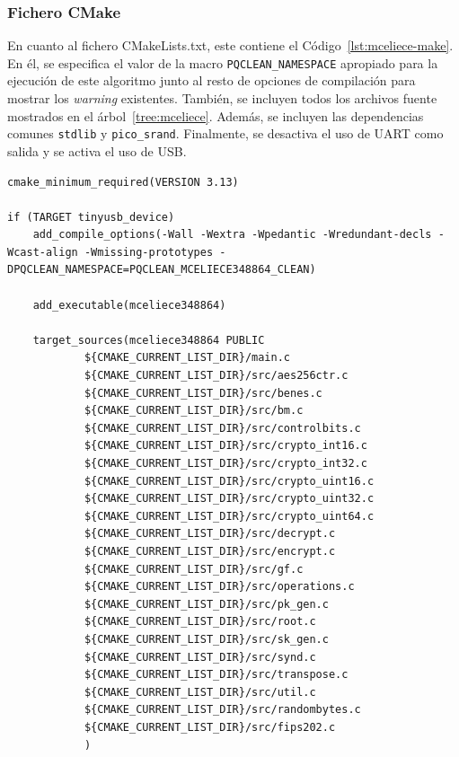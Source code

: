 \subsubsection{Fichero CMake}\label{subsubsec:mceliece-cmake}

En cuanto al fichero CMakeLists.txt, este contiene el Código~\ref{lst:mceliece-make}.
En él, se especifica el valor de la macro \texttt{PQCLEAN\_NAMESPACE} apropiado para la ejecución de este algoritmo junto al resto de opciones de compilación para mostrar los \textit{warning} existentes.
También, se incluyen todos los archivos fuente mostrados en el árbol~\ref{tree:mceliece}.
Además, se incluyen las dependencias comunes \texttt{stdlib} y \texttt{pico\_srand}.
Finalmente, se desactiva el uso de \ac{UART} como salida y se activa el uso de \ac{USB}.

\begin{lstlisting}[label={lst:mceliece-make},style=Cnice,firstnumber=1,caption={Archivo \texttt{McEliece348864/CMakeLists.txt}.}]
cmake_minimum_required(VERSION 3.13)

if (TARGET tinyusb_device)
    add_compile_options(-Wall -Wextra -Wpedantic -Wredundant-decls -Wcast-align -Wmissing-prototypes -DPQCLEAN_NAMESPACE=PQCLEAN_MCELIECE348864_CLEAN)

    add_executable(mceliece348864)

    target_sources(mceliece348864 PUBLIC
            ${CMAKE_CURRENT_LIST_DIR}/main.c
            ${CMAKE_CURRENT_LIST_DIR}/src/aes256ctr.c
            ${CMAKE_CURRENT_LIST_DIR}/src/benes.c
            ${CMAKE_CURRENT_LIST_DIR}/src/bm.c
            ${CMAKE_CURRENT_LIST_DIR}/src/controlbits.c
            ${CMAKE_CURRENT_LIST_DIR}/src/crypto_int16.c
            ${CMAKE_CURRENT_LIST_DIR}/src/crypto_int32.c
            ${CMAKE_CURRENT_LIST_DIR}/src/crypto_uint16.c
            ${CMAKE_CURRENT_LIST_DIR}/src/crypto_uint32.c
            ${CMAKE_CURRENT_LIST_DIR}/src/crypto_uint64.c
            ${CMAKE_CURRENT_LIST_DIR}/src/decrypt.c
            ${CMAKE_CURRENT_LIST_DIR}/src/encrypt.c
            ${CMAKE_CURRENT_LIST_DIR}/src/gf.c
            ${CMAKE_CURRENT_LIST_DIR}/src/operations.c
            ${CMAKE_CURRENT_LIST_DIR}/src/pk_gen.c
            ${CMAKE_CURRENT_LIST_DIR}/src/root.c
            ${CMAKE_CURRENT_LIST_DIR}/src/sk_gen.c
            ${CMAKE_CURRENT_LIST_DIR}/src/synd.c
            ${CMAKE_CURRENT_LIST_DIR}/src/transpose.c
            ${CMAKE_CURRENT_LIST_DIR}/src/util.c
            ${CMAKE_CURRENT_LIST_DIR}/src/randombytes.c
            ${CMAKE_CURRENT_LIST_DIR}/src/fips202.c
            )
    

\end{lstlisting}
